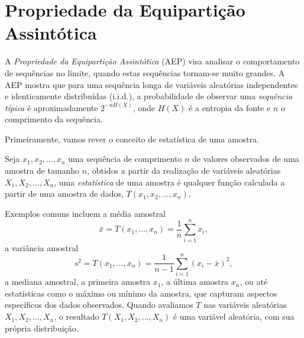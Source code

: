 \chapter{Propriedade da Equipartição Assintótica}

A \emph{Propriedade da Equipartição Assintótica} (AEP) visa analisar o comportamento
de sequências no limite, quando estas sequências tornam-se muito grandes.  A
AEP mostra que para uma sequência longa de variáveis aleatórias independentes e
identicamente distribuídas (i.i.d.), a probabilidade de observar uma \emph{sequência
típica} é aproximadamente $2^{-nH(X)}$, onde $H(X)$ é a entropia da fonte e $n$
o comprimento da sequência.

Primeiramente, vamos rever o conceito de estatística de uma amostra.
\begin{definition}
    Seja $x_1, x_2, \ldots, x_n$ uma sequência de comprimento $n$ de valores observados
    de uma amostra de tamanho $n$, obtidos a partir da realização de variáveis aleatórias
    $X_1, X_2, \ldots, X_n$, uma \emph{estatística} de uma amostra é qualquer função calculada a partir
    de uma amostra de dados, $T(x_1, x_2, \ldots, x_n)$.
\end{definition}
Exemplos comuns incluem a média amostral
\begin{equation}
  \bar{x} = T(x_1, \ldots, x_n) = \frac{1}{n} \sum_{i=1}^n x_i ,
\end{equation}
a variância amostral
\begin{equation}
  s^2 = T(x_1, \ldots, x_n) = \frac{1}{n-1} \sum_{i=1}^n (x_i - \bar{x})^2 ,
\end{equation}
a mediana amostral, a primeira amostra $x_1$, a última amostra $x_n$,
ou até estatísticas como o máximo ou mínimo da amostra, que capturam aspectos específicos dos dados observados.
Quando avaliamos $T$ nas variáveis aleatórias $X_1, X_2, \ldots, X_n$, o resultado $T(X_1,X_2,\ldots,X_n)$
é uma variável aleatória, com sua própria distribuição.


